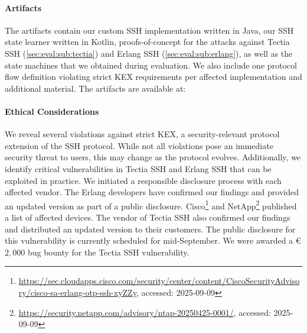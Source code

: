 \paragraph{Artifacts}

The artifacts contain our custom SSH implementation written in Java, our SSH state learner written in Kotlin, proofs-of-concept for the attacks against Tectia SSH (\autoref{sec:eval:sub:tectia}) and Erlang SSH (\autoref{sec:eval:sub:erlang}), as well as the state machines that we obtained during evaluation. We also include one protocol flow definition violating strict KEX requirements per affected implementation and additional material. 
%
The artifacts are available at:
\begin{quote}
    \artifactsUrl
\end{quote}

\paragraph{Ethical Considerations}

We reveal several violations against strict KEX, a security-relevant protocol extension of the SSH protocol. While not all violations pose an immediate security threat to users, this may change as the protocol evolves. Additionally, we identify critical vulnerabilities in Tectia SSH and Erlang SSH that can be exploited in practice. We initiated a responsible disclosure process with each affected vendor. The Erlang developers have confirmed our findings and provided an updated version as part of a public disclosure. Cisco\footnote{\url{https://sec.cloudapps.cisco.com/security/center/content/CiscoSecurityAdvisory/cisco-sa-erlang-otp-ssh-xyZZy}, accessed: 2025-09-09} and NetApp\footnote{\url{https://security.netapp.com/advisory/ntap-20250425-0001/}, accessed: 2025-09-09} published a list of affected devices. The vendor of Tectia SSH also confirmed our findings and distributed an updated version to their customers. The public disclosure for this vulnerability is currently scheduled for mid-September. We were awarded a €$2{,}000$ bug bounty for the Tectia SSH vulnerability.
